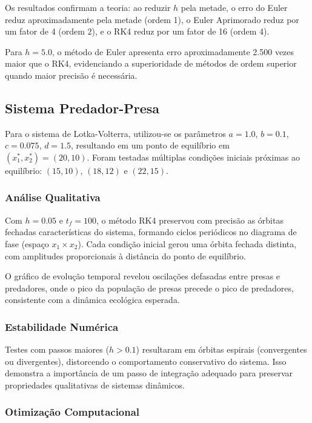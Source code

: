 \documentclass[11pt,a4paper]{article}
\begin{document}
Os resultados confirmam a teoria: ao reduzir $h$ pela metade, o erro do Euler reduz aproximadamente pela metade (ordem 1), o Euler Aprimorado reduz por um fator de 4 (ordem 2), e o RK4 reduz por um fator de 16 (ordem 4).

Para $h = 5.0$, o método de Euler apresenta erro aproximadamente 2.500 vezes maior que o RK4, evidenciando a superioridade de métodos de ordem superior quando maior precisão é necessária.

\subsection{Sistema Predador-Presa}

Para o sistema de Lotka-Volterra, utilizou-se os parâmetros $a = 1.0$, $b = 0.1$, $c = 0.075$, $d = 1.5$, resultando em um ponto de equilíbrio em $(x_1^*, x_2^*) = (20, 10)$. Foram testadas múltiplas condições iniciais próximas ao equilíbrio: $(15, 10)$, $(18, 12)$ e $(22, 15)$.

\subsubsection{Análise Qualitativa}

Com $h = 0.05$ e $t_f = 100$, o método RK4 preservou com precisão as órbitas fechadas características do sistema, formando ciclos periódicos no diagrama de fase (espaço $x_1 \times x_2$). Cada condição inicial gerou uma órbita fechada distinta, com amplitudes proporcionais à distância do ponto de equilíbrio.

O gráfico de evolução temporal revelou oscilações defasadas entre presas e predadores, onde o pico da população de presas precede o pico de predadores, consistente com a dinâmica ecológica esperada.

\subsubsection{Estabilidade Numérica}

Testes com passos maiores ($h > 0.1$) resultaram em órbitas espirais (convergentes ou divergentes), distorcendo o comportamento conservativo do sistema. Isso demonstra a importância de um passo de integração adequado para preservar propriedades qualitativas de sistemas dinâmicos.

\subsubsection{Otimização Computacional}
\end{document}
